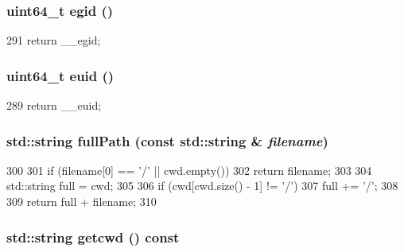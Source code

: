 \hypertarget{classLiveProcess_a0868ad9fa2d15bdaa033a861d2448edc}{
\subsubsection[{egid}]{\setlength{\rightskip}{0pt plus 5cm}uint64\_\-t egid ()}}
\label{classLiveProcess_a0868ad9fa2d15bdaa033a861d2448edc}



\begin{DoxyCode}
291 {return __egid;}
\end{DoxyCode}
\hypertarget{classLiveProcess_a37002dbf259d35128485c6014a0c2fd9}{
\subsubsection[{euid}]{\setlength{\rightskip}{0pt plus 5cm}uint64\_\-t euid ()}}
\label{classLiveProcess_a37002dbf259d35128485c6014a0c2fd9}



\begin{DoxyCode}
289 {return __euid;}
\end{DoxyCode}
\hypertarget{classLiveProcess_a9c94a4c8c47961ea420f67ad43c4a5e5}{
\subsubsection[{fullPath}]{\setlength{\rightskip}{0pt plus 5cm}std::string fullPath (const std::string \& {\em filename})}}
\label{classLiveProcess_a9c94a4c8c47961ea420f67ad43c4a5e5}



\begin{DoxyCode}
300     {
301         if (filename[0] == '/' || cwd.empty())
302             return filename;
303 
304         std::string full = cwd;
305 
306         if (cwd[cwd.size() - 1] != '/')
307             full += '/';
308 
309         return full + filename;
310     }
\end{DoxyCode}
\hypertarget{classLiveProcess_aba6680a83910e09f666106e67bc10c3b}{
\subsubsection[{getcwd}]{\setlength{\rightskip}{0pt plus 5cm}std::string getcwd () const}}
\label{classLiveProcess_aba6680a83910e09f666106e67bc10c3b}



